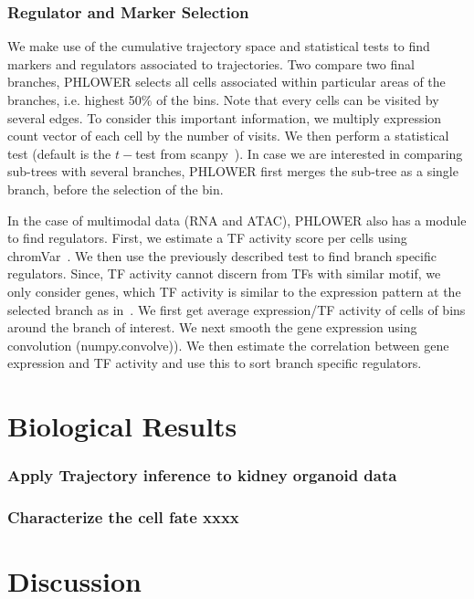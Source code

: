 \subsubsection{Regulator and Marker Selection}
We make use of the cumulative trajectory space and statistical tests to find markers and regulators associated to trajectories. Two compare two final branches, PHLOWER selects all cells associated within particular areas of the branches, i.e. highest 50$\%$ of the bins. Note that every cells can be visited by several edges. To consider this important information, we multiply expression count vector of each cell by the number of visits. We then perform a statistical test (default is the $t-$test from scanpy~\cite{wolf2018scanpy}). In case we are interested in comparing sub-trees with several branches, PHLOWER first merges the sub-tree as a single branch, before the selection of the bin.

In the case of multimodal data (RNA and ATAC), PHLOWER also has a module to find regulators. First, we estimate a TF activity score per cells using chromVar~\cite{schep2017chromvar}. We then use the previously described test to find branch specific regulators. Since, TF activity cannot discern from TFs with similar motif, we only consider genes, which TF activity is similar to the expression pattern at the selected branch as in~\cite{li2023scmega}. We first get average expression/TF activity of cells of bins around the branch of interest. We next smooth the gene expression using convolution (numpy.convolve)). We then estimate the correlation between gene expression and TF activity and use this to sort branch specific regulators. 

\section{Biological Results}
\subsubsection{Apply Trajectory inference to kidney organoid data}
\subsubsection{Characterize the cell fate xxxx}
\section{Discussion}

